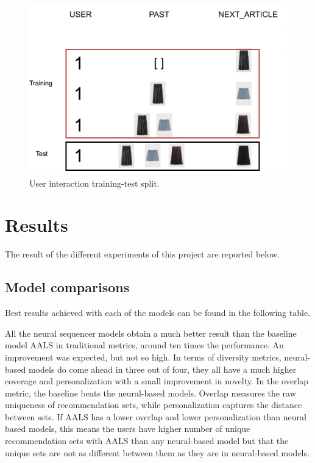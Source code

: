 \documentclass{kththesis}
\begin{document}
\begin{figure}[H]
    \centering
    \includegraphics[scale=0.45]{images/dataset/datasetsplit.png}
    \caption{User interaction training-test split.}
\end{figure}

\section{Results}
The result of the different experiments of this project are reported below.

\subsection{Model comparisons}
Best results achieved with each of the models can be found in the following table.

\begin{center}

\end{center}

All the neural sequencer models obtain a much better result than the baseline model AALS in traditional metrics, around ten times the performance. An improvement was expected, but not so high. In terms of diversity metrics, neural-based models do come ahead in three out of four, they all have a much higher coverage and personalization with a small improvement in novelty. In the overlap metric, the baseline beats the neural-based models. Overlap measures the raw uniqueness of recommendation sets, while personalization captures the distance between sets. If AALS has a lower overlap and lower personalization than neural based models, this means the users have higher number of unique recommendation sets with AALS than any neural-based model but that the unique sets are not as different between them as they are in neural-based models. 
\end{document}
